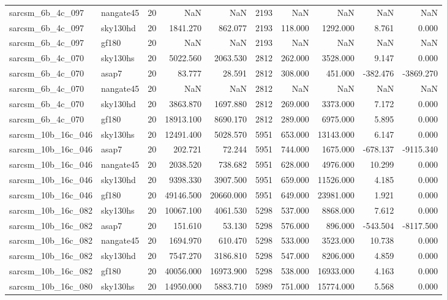 \documentclass{article}
\begin{document}
\begin{longtable}{llrrrrrrrr}
sarcsm\_6b\_4c\_097 & nangate45 & 20 & NaN & NaN & 2193 & NaN & NaN & NaN & NaN \\
sarcsm\_6b\_4c\_097 & sky130hd & 20 & 1841.270 & 862.077 & 2193 & 118.000 & 1292.000 & 8.761 & 0.000 \\
sarcsm\_6b\_4c\_097 & gf180 & 20 & NaN & NaN & 2193 & NaN & NaN & NaN & NaN \\
sarcsm\_6b\_4c\_070 & sky130hs & 20 & 5022.560 & 2063.530 & 2812 & 262.000 & 3528.000 & 9.147 & 0.000 \\
sarcsm\_6b\_4c\_070 & asap7 & 20 & 83.777 & 28.591 & 2812 & 308.000 & 451.000 & -382.476 & -3869.270 \\
sarcsm\_6b\_4c\_070 & nangate45 & 20 & NaN & NaN & 2812 & NaN & NaN & NaN & NaN \\
sarcsm\_6b\_4c\_070 & sky130hd & 20 & 3863.870 & 1697.880 & 2812 & 269.000 & 3373.000 & 7.172 & 0.000 \\
sarcsm\_6b\_4c\_070 & gf180 & 20 & 18913.100 & 8690.170 & 2812 & 289.000 & 6975.000 & 5.895 & 0.000 \\
sarcsm\_10b\_16c\_046 & sky130hs & 20 & 12491.400 & 5028.570 & 5951 & 653.000 & 13143.000 & 6.147 & 0.000 \\
sarcsm\_10b\_16c\_046 & asap7 & 20 & 202.721 & 72.244 & 5951 & 744.000 & 1675.000 & -678.137 & -9115.340 \\
sarcsm\_10b\_16c\_046 & nangate45 & 20 & 2038.520 & 738.682 & 5951 & 628.000 & 4976.000 & 10.299 & 0.000 \\
sarcsm\_10b\_16c\_046 & sky130hd & 20 & 9398.330 & 3907.500 & 5951 & 659.000 & 11526.000 & 4.185 & 0.000 \\
sarcsm\_10b\_16c\_046 & gf180 & 20 & 49146.500 & 20660.000 & 5951 & 649.000 & 23981.000 & 1.921 & 0.000 \\
sarcsm\_10b\_16c\_082 & sky130hs & 20 & 10067.100 & 4061.530 & 5298 & 537.000 & 8868.000 & 7.612 & 0.000 \\
sarcsm\_10b\_16c\_082 & asap7 & 20 & 151.610 & 53.130 & 5298 & 576.000 & 896.000 & -543.504 & -8117.500 \\
sarcsm\_10b\_16c\_082 & nangate45 & 20 & 1694.970 & 610.470 & 5298 & 533.000 & 3523.000 & 10.738 & 0.000 \\
sarcsm\_10b\_16c\_082 & sky130hd & 20 & 7547.270 & 3186.810 & 5298 & 547.000 & 8206.000 & 4.859 & 0.000 \\
sarcsm\_10b\_16c\_082 & gf180 & 20 & 40056.000 & 16973.900 & 5298 & 538.000 & 16933.000 & 4.163 & 0.000 \\
sarcsm\_10b\_16c\_080 & sky130hs & 20 & 14950.000 & 5883.710 & 5989 & 751.000 & 15774.000 & 5.568 & 0.000 \\

\end{longtable}
\end{document}
